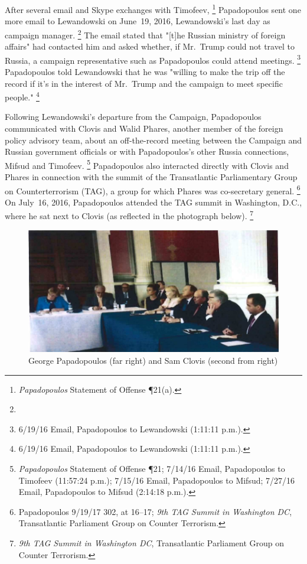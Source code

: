 After several email and Skype exchanges with Timofeev,%
\footnote{\textit{Papadopoulos} Statement of Offense \P 21(a).}
Papadopoulos sent one more email to Lewandowski on June~19, 2016, Lewandowski's last day as campaign manager.%
\footnote{}
The email stated that "[t]he Russian ministry of foreign affairs" had contacted him and asked whether, if Mr.~Trump could not travel to Russia, a campaign representative such as Papadopoulos could attend meetings.%
\footnote{6/19/16 Email, Papadopoulos to Lewandowski (1:11:11 p.m.).}
Papadopoulos told Lewandowski that he was "willing to make the trip off the record if it's in the interest of Mr.~Trump and the campaign to meet specific people."%
\footnote{6/19/16 Email, Papadopoulos to Lewandowski (1:11:11 p.m.).}

Following Lewandowski's departure from the Campaign, Papadopoulos communicated with Clovis and Walid Phares, another member of the foreign policy advisory team, about an off-the-record meeting between the Campaign and Russian government officials or with Papadopoulos's other Russia connections, Mifsud and Timofeev.%
\footnote{\textit{Papadopoulos} Statement of Offense \P 21;
7/14/16 Email, Papadopoulos to Timofeev (11:57:24 p.m.);
7/15/16 Email, Papadopoulos to Mifsud;
7/27/16 Email, Papadopoulos to Mifsud (2:14:18 p.m.).}
Papadopoulos also interacted directly with Clovis and Phares in connection with the summit of the Transatlantic Parliamentary Group on Counterterrorism (TAG), a group for which Phares was co-secretary general.%
\footnote{Papadopoulos 9/19/17 302, at 16--17;
\textit{9th TAG Summit in Washington DC}, Transatlantic Parliament Group on Counter Terrorism.}
On July~16, 2016, Papadopoulos attended the TAG summit in Washington, D.C., where he sat next to Clovis (as reflected in the photograph below).%
\footnote{\textit{9th TAG Summit in Washington DC}, Transatlantic Parliament Group on Counter Terrorism.}

\begin{figure}[t]
    \vspace{-20pt}
    \begin{center}
        \includegraphics[width=5in]{images/p-91-papadopolous-clovis.png}%
    \end{center}
    \vspace{-20pt}
    \caption*{George Papadopoulos (far right) and Sam Clovis (second from right)}
    \vspace{-10pt}
    \label{fig:papadopolous-clovis}
\end{figure}

